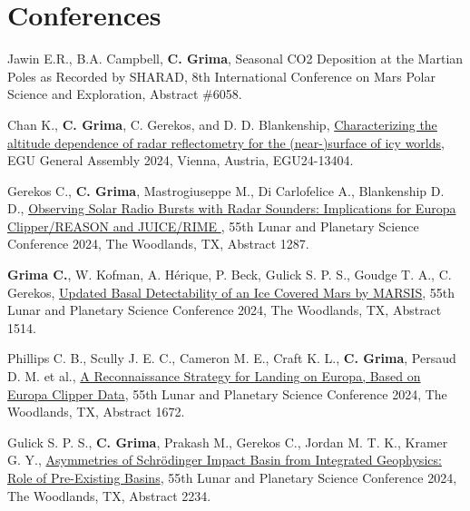 \section*{Conferences}



\begin{etaremune}
\def\labelenumi{\arabic{enumi}.}


\item
    Jawin E.R., B.A. Campbell, \textbf{C. Grima}, Seasonal CO2 Deposition at the Martian Poles as Recorded by SHARAD, 8th International Conference on Mars Polar Science and Exploration, Abstract \#6058.

\item
     Chan K., \textbf{C. Grima}, C. Gerekos, and D. D. Blankenship, \href{https://meetingorganizer.copernicus.org/EGU24/EGU24-13404.html}{Characterizing the altitude dependence of radar reflectometry for the (near-)surface of icy worlds}, EGU General Assembly 2024, Vienna, Austria, EGU24-13404.

\item
     Gerekos C., \textbf{C. Grima}, Mastrogiuseppe M., Di Carlofelice A., Blankenship D. D., \href{https://www.hou.usra.edu/meetings/lpsc2024/pdf/1287.pdf}{Observing Solar Radio Bursts with Radar Sounders: Implications for Europa Clipper/REASON and JUICE/RIME }, 55th Lunar and Planetary Science Conference 2024, The Woodlands, TX, Abstract 1287.

\item
    \textbf{Grima C.}, W. Kofman, A. Hérique, P. Beck, Gulick S. P. S., Goudge T. A., C. Gerekos, \href{https://www.hou.usra.edu/meetings/lpsc2024/pdf/1514.pdf}{Updated Basal Detectability of an Ice Covered Mars by MARSIS}, 55th Lunar and Planetary Science Conference 2024, The Woodlands, TX, Abstract 1514.

\item
     Phillips C. B., Scully J. E. C., Cameron M. E., Craft K. L., \textbf{C. Grima}, Persaud D. M. et al., \href{https://www.hou.usra.edu/meetings/lpsc2024/pdf/1672.pdf}{A Reconnaissance Strategy for Landing on Europa, Based on Europa Clipper Data}, 55th Lunar and Planetary Science Conference 2024, The Woodlands, TX, Abstract 1672.

\item
     Gulick S. P. S., \textbf{C. Grima}, Prakash M., Gerekos C., Jordan M. T. K., Kramer G. Y., \href{https://www.hou.usra.edu/meetings/lpsc2024/pdf/2234.pdf}{Asymmetries of Schrödinger Impact Basin from Integrated Geophysics: Role of Pre-Existing Basins}, 55th Lunar and Planetary Science Conference 2024, The Woodlands, TX, Abstract 2234.


\end{etaremune}
